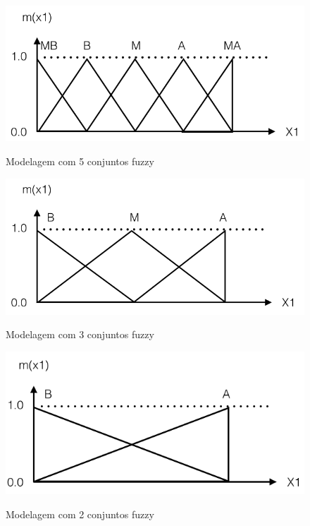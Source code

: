 \begin{figure}[h]
\caption{Modelagem com 5 conjuntos fuzzy}
\centering
\includegraphics[scale=0.45]{cinco_conjuntos_fuzzy.png}
\label{figura:cinco_conjuntos_fuzzy}
\end{figure}

\begin{figure}[h]
\caption{Modelagem com 3 conjuntos fuzzy}
\centering
\includegraphics[scale=0.45]{tres_conjuntos_fuzzy.png}
\label{figura:tres_conjuntos_fuzzy}
\end{figure}

\begin{figure}[h]
\caption{Modelagem com 2 conjuntos fuzzy}
\centering
\includegraphics[scale=0.45]{conjuntos_fuzzy_entrada_final.png}
\label{figura:conjuntos_fuzzy_entrada_final}
\end{figure}

